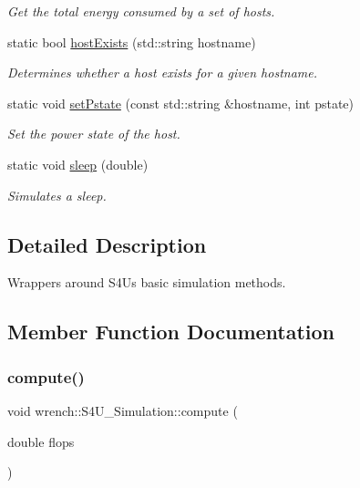\begin{DoxyCompactItemize}
\begin{DoxyCompactList}\small\item\em Get the total energy consumed by a set of hosts. \end{DoxyCompactList}\item 
static bool \hyperlink{classwrench_1_1_s4_u___simulation_a64a1b7d70b4b0b5965b304d379b4a19d}{host\+Exists} (std\+::string hostname)
\begin{DoxyCompactList}\small\item\em Determines whether a host exists for a given hostname. \end{DoxyCompactList}\item 
static void \hyperlink{classwrench_1_1_s4_u___simulation_a8ee21fa866cf3bd222e2cbcf27b6d340}{set\+Pstate} (const std\+::string \&hostname, int pstate)
\begin{DoxyCompactList}\small\item\em Set the power state of the host. \end{DoxyCompactList}\item 
static void \hyperlink{classwrench_1_1_s4_u___simulation_af93ef50da20f860de80212a3cff1cfdb}{sleep} (double)
\begin{DoxyCompactList}\small\item\em Simulates a sleep. \end{DoxyCompactList}\end{DoxyCompactItemize}


\subsection{Detailed Description}
Wrappers around S4U\textquotesingle{}s basic simulation methods. 

\subsection{Member Function Documentation}
\mbox{\label{classwrench_1_1_s4_u___simulation_a3be8d3823b30b2b7ebb27771a8baa0cd}} 
\subsubsection{\texorpdfstring{compute()}{compute()}}
{\footnotesize\ttfamily void wrench\+::\+S4\+U\+\_\+\+Simulation\+::compute (\begin{DoxyParamCaption}\item[{double}]{flops }\end{DoxyParamCaption})\hspace{0.3cm}{\ttfamily [static]}}



